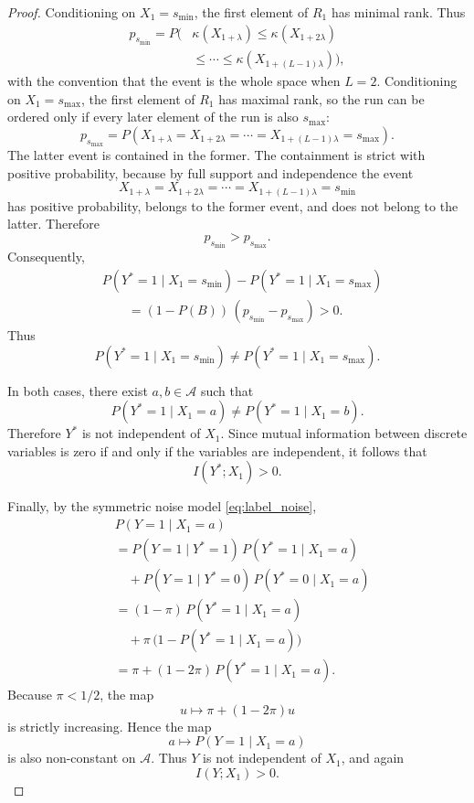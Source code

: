 \documentclass[fullpaper]{nldl}
\theoremstyle{plain}
\theoremstyle{definition}
\theoremstyle{remark}
\begin{document}
\begin{proof}
Conditioning on $X_1=s_{\min}$, the first element of $R_1$ has minimal
rank. Thus
\[
\begin{aligned}
p_{s_{\min}}
=
P\bigl(
&\kappa(X_{1+\lambda})
\leq
\kappa(X_{1+2\lambda})\\
&\leq
\cdots
\leq
\kappa(X_{1+(L-1)\lambda})
\bigr),
\end{aligned}
\]
with the convention that the event is the whole space when $L=2$.
Conditioning on $X_1=s_{\max}$, the first element of $R_1$ has maximal rank,
so the run can be ordered only if every later element of the run is also
$s_{\max}$:
\[
p_{s_{\max}}
=
P\!\left(
X_{1+\lambda}=X_{1+2\lambda}=\cdots=X_{1+(L-1)\lambda}=s_{\max}
\right).
\]
The latter event is contained in the former. The containment is strict with
positive probability, because by full support and independence the event
\[
X_{1+\lambda}=X_{1+2\lambda}=\cdots=X_{1+(L-1)\lambda}=s_{\min}
\]
has positive probability, belongs to the former event, and does not belong to
the latter. Therefore
\[
p_{s_{\min}}>p_{s_{\max}}.
\]
Consequently,
\begin{align*}
&P(Y^*=1\mid X_1=s_{\min})
-
P(Y^*=1\mid X_1=s_{\max})
\\
&\qquad =
(1-P(B))\,(p_{s_{\min}}-p_{s_{\max}})
>0.
\end{align*}
Thus
\[
P(Y^*=1\mid X_1=s_{\min})
\neq
P(Y^*=1\mid X_1=s_{\max}).
\]

In both cases, there exist $a,b\in\mathcal{A}$ such that
\[
P(Y^*=1\mid X_1=a)\neq P(Y^*=1\mid X_1=b).
\]
Therefore $Y^*$ is not independent of $X_1$. Since mutual information
between discrete variables is zero if and only if the variables are
independent, it follows that
\[
I(Y^*;X_1)>0.
\]

Finally, by the symmetric noise model \eqref{eq:label_noise},
\begin{align*}
&P(Y=1\mid X_1=a)\\
&=
P(Y=1\mid Y^*=1)\,P(Y^*=1\mid X_1=a)
\\
&\quad+
P(Y=1\mid Y^*=0)\,P(Y^*=0\mid X_1=a)
\\
&=
(1-\pi)\,P(Y^*=1\mid X_1=a)\\
&\quad+
\pi\,\bigl(1-P(Y^*=1\mid X_1=a)\bigr)
\\
&=
\pi + (1-2\pi)\,P(Y^*=1\mid X_1=a).
\end{align*}
Because $\pi<1/2$, the map
\[
u \longmapsto \pi + (1-2\pi)u
\]
is strictly increasing. Hence the map
\[
a \longmapsto P(Y=1\mid X_1=a)
\]
is also non-constant on $\mathcal{A}$. Thus $Y$ is not independent of $X_1$,
and again
\[
I(Y;X_1)>0.
\]
\end{proof}
\end{document}

